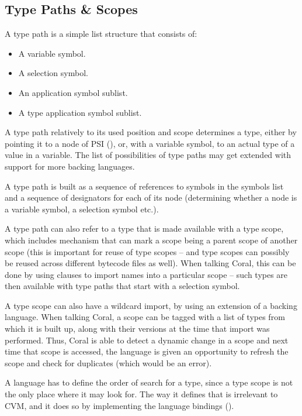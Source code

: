 \subsection{Type Paths \& Scopes}

A type path is a simple list structure that consists of: 
\begin{itemize}
\item A variable symbol. 
\item A selection symbol. 
\item An application symbol sublist. 
\item A type application symbol sublist. 
\end{itemize}

A type path relatively to its used position and scope determines a type, either by pointing it to a node of PSI (), or, with a variable symbol, to an actual type of a value in a variable. The list of possibilities of type paths may get extended with support for more backing languages. 

A type path is built as a sequence of references to symbols in the symbols list and a sequence of designators for each of its node (determining whether a node is a variable symbol, a selection symbol etc.).

A type path can also refer to a type that is made available with a type scope, which includes mechanism that can mark a scope being a parent scope of another scope (this is important for reuse of type scopes -- and type scopes can possibly be reused across different bytecode files as well). When talking Coral, this can be done by using  clauses to import names into a particular scope -- such types are then available with type paths that start with a selection symbol. 

A type scope can also have a wildcard import, by using an extension of a backing language. When talking Coral, a scope can be tagged with a list of types from which it is built up, along with their versions at the time that import was performed. Thus, Coral is able to detect a dynamic change in a scope and next time that scope is accessed, the language is given an opportunity to refresh the scope and check for duplicates (which would be an error). 

A language has to define the order of search for a type, since a type scope is not the only place where it may look for. The way it defines that is irrelevant to CVM, and it does so by implementing the language bindings (). 

